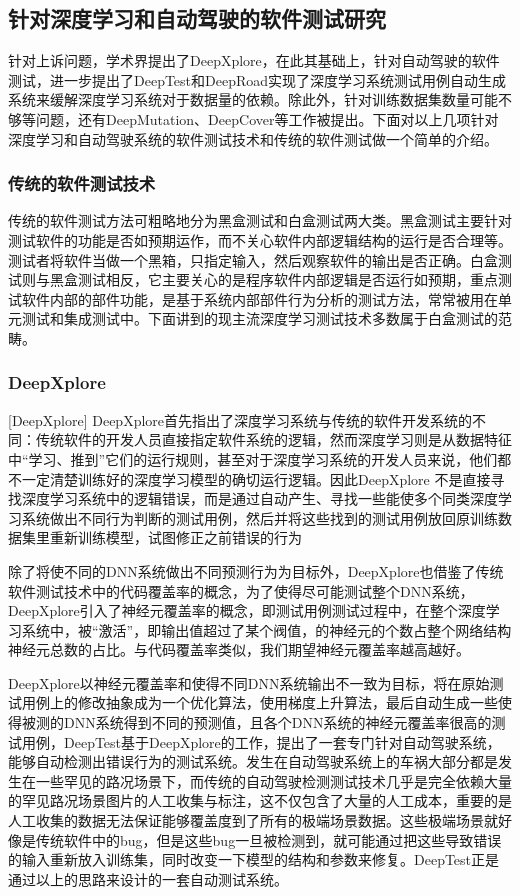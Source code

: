 \subsection{针对深度学习和自动驾驶的软件测试研究}

针对上诉问题，学术界提出了DeepXplore，在此其基础上，针对自动驾驶的软件测试，进一步提出了DeepTest和DeepRoad实现了深度学习系统测试用例自动生成系统来缓解深度学习系统对于数据量的依赖。除此外，针对训练数据集数量可能不够等问题，还有DeepMutation\cite{DeepMutation}、DeepCover\cite{DeepCover}等工作被提出。下面对以上几项针对深度学习和自动驾驶系统的软件测试技术和传统的软件测试做一个简单的介绍。

\subsubsection{传统的软件测试技术}

传统的软件测试方法可粗略地分为黑盒测试和白盒测试两大类。黑盒测试主要针对测试软件的功能是否如预期运作，而不关心软件内部逻辑结构的运行是否合理等。测试者将软件当做一个黑箱，只指定输入，然后观察软件的输出是否正确。白盒测试则与黑盒测试相反，它主要关心的是程序软件内部逻辑是否运行如预期，重点测试软件内部的部件功能，是基于系统内部部件行为分析的测试方法，常常被用在单元测试和集成测试中。下面讲到的现主流深度学习测试技术多数属于白盒测试的范畴。

\subsubsection{DeepXplore}[DeepXplore]
DeepXplore首先指出了深度学习系统与传统的软件开发系统的不同：传统软件的开发人员直接指定软件系统的逻辑，然而深度学习则是从数据特征中“学习、推到”它们的运行规则，甚至对于深度学习系统的开发人员来说，他们都不一定清楚训练好的深度学习模型的确切运行逻辑。因此DeepXplore
不是直接寻找深度学习系统中的逻辑错误，而是通过自动产生、寻找一些能使多个同类深度学习系统做出不同行为判断的测试用例，然后并将这些找到的测试用例放回原训练数据集里重新训练模型，试图修正之前错误的行为

除了将使不同的DNN系统做出不同预测行为为目标外，DeepXplore也借鉴了传统软件测试技术中的代码覆盖率的概念，为了使得尽可能测试整个DNN系统，DeepXplore引入了神经元覆盖率的概念，即测试用例测试过程中，在整个深度学习系统中，被“激活”，即输出值超过了某个阀值，的神经元的个数占整个网络结构神经元总数的占比。与代码覆盖率类似，我们期望神经元覆盖率越高越好。

DeepXplore以神经元覆盖率和使得不同DNN系统输出不一致为目标，将在原始测试用例上的修改抽象成为一个优化算法，使用梯度上升算法，最后自动生成一些使得被测的DNN系统得到不同的预测值，且各个DNN系统的神经元覆盖率很高的测试用例，DeepTest基于DeepXplore的工作，提出了一套专门针对自动驾驶系统，能够自动检测出错误行为的测试系统。发生在自动驾驶系统上的车祸大部分都是发生在一些罕见的路况场景下，而传统的自动驾驶检测测试技术几乎是完全依赖大量的罕见路况场景图片的人工收集与标注，这不仅包含了大量的人工成本，重要的是人工收集的数据无法保证能够覆盖度到了所有的极端场景数据。这些极端场景就好像是传统软件中的bug，但是这些bug一旦被检测到，就可能通过把这些导致错误的输入重新放入训练集，同时改变一下模型的结构和参数来修复。DeepTest正是通过以上的思路来设计的一套自动测试系统。

